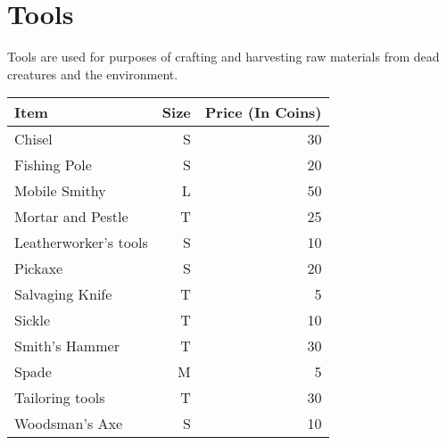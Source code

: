 \section{Tools}
Tools are used for purposes of crafting and harvesting raw materials from dead creatures and the environment.

\begin{longtable}{l | r | r}
	Item & Size & Price (In Coins)\\ \hline
	Chisel & S & 30\\
	Fishing Pole & S & 20\\
	Mobile Smithy & L & 50\\
	Mortar and Pestle & T & 25\\
	Leatherworker's tools & S & 10\\
	Pickaxe & S & 20\\
	Salvaging Knife & T & 5\\
	Sickle & T & 10\\
	Smith's Hammer & T & 30\\
	Spade & M & 5\\
	Tailoring tools & T & 30\\
	Woodsman's Axe & S & 10\\
\end{longtable}